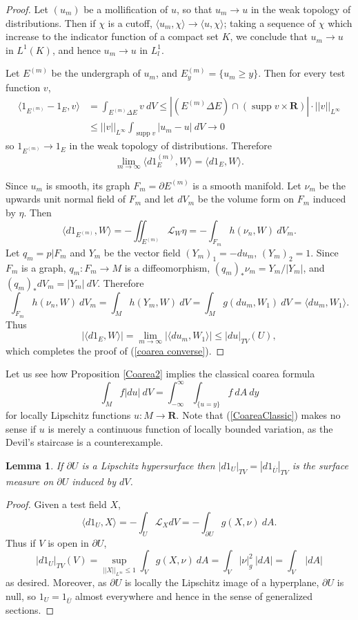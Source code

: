 \documentclass[reqno,12pt,letterpaper]{amsart}
\newcommand{\RR}{\mathbf{R}}
\DeclareMathOperator{\supp}{supp}
\newtheorem{lemma}[theorem]{Lemma}
\theoremstyle{definition}
\numberwithin{equation}{section}
\begin{document}
\begin{proof}
Let $(u_m)$ be a mollification of $u$, so that $u_m \to u$ in the weak topology of distributions.
Then if $\chi$ is a cutoff, $\langle u_m, \chi\rangle \to \langle u, \chi\rangle$; taking a sequence of $\chi$ which increase to the indicator function of a compact set $K$, we conclude that $u_m \to u$ in $L^1(K)$, and hence $u_m \to u$ in $L^1_l$.

Let $E^{(m)}$ be the undergraph of $u_m$, and $E^{(m)}_y = \{u_m \geq y\}$.
Then for every test function $v$,
\begin{align*}
\langle 1_{E^{(m)}} - 1_E, v\rangle &= \int_{E^{(m)} \Delta E} v ~dV \leq |(E^{(m)} \Delta E) \cap (\supp v \times \RR)| \cdot ||v||_{L^\infty}\\
&\leq ||v||_{L^\infty} \int_{\supp v} |u_m - u| ~dV \to 0
\end{align*}
so $1_{E^{(m)}} \to 1_E$ in the weak topology of distributions.
Therefore
$$\lim_{m \to \infty} \langle d 1_E^{(m)}, W\rangle = \langle d 1_E, W\rangle.$$

Since $u_m$ is smooth, its graph $F_m = \partial E^{(m)}$ is a smooth manifold.
Let $\nu_m$ be the upwards unit normal field of $F_m$ and let $dV_m$ be the volume form on $F_m$ induced by $\eta$.
Then
$$\langle d 1_{E^{(m)}}, W\rangle = -\iint_{E^{(m)}} \mathcal L_W\eta = -\int_{F_m} h(\nu_n, W) ~dV_m.$$
Let $q_m = p|F_m$ and $Y_m$ be the vector field $(Y_m)_1 = -d u_m$, $(Y_m)_2 = 1$.
Since $F_m$ is a graph, $q_m: F_m \to M$ is a diffeomorphism, $(q_m)_*\nu_m = Y_m/|Y_m|$, and $(q_m)_*dV_m = |Y_m|~dV$. Therefore
$$\int_{F_m} h(\nu_n, W) ~dV_m = \int_M h(Y_m, W) ~dV = \int_M g(d u_m, W_1) ~dV = \langle d u_m, W_1\rangle.$$
Thus
$$|\langle d 1_E, W\rangle| = \lim_{m \to \infty} |\langle d u_m, W_1\rangle| \leq |d u|_{TV}(U),$$
which completes the proof of (\ref{coarea converse}).
\end{proof}

Let us see how Proposition \ref{Coarea2} implies the classical coarea formula
\begin{equation}
\label{CoareaClassic}
\int_M f |du| ~dV = \int_{-\infty}^\infty \int_{\{u = y\}} f ~dA ~dy
\end{equation}
for locally Lipschitz functions $u: M \to \RR$.
Note that (\ref{CoareaClassic}) makes no sense if $u$ is merely a continuous function of locally bounded variation, as the Devil's staircase is a counterexample.

\begin{lemma}\label{Rademacher manifold}
If $\partial U$ is a Lipschitz hypersurface then $|d1_U|_{TV} = |d1_{\overline U}|_{TV}$ is the surface measure on $\partial U$ induced by $dV$.
\end{lemma}
\begin{proof}
Given a test field $X$,
$$\langle d1_U, X\rangle = -\int_U \mathcal L_XdV = -\int_{\partial U} g(X, \nu) ~dA.$$
Thus if $V$ is open in $\partial U$,
$$|d1_U|_{TV}(V) = \sup_{||X||_{L^\infty} \leq 1} \int_V g(X, \nu) ~dA = \int_V |\nu|_g^2 ~|dA| = \int_V ~|dA|$$
as desired.
Moreover, as $\partial U$ is locally the Lipschitz image of a hyperplane, $\partial U$ is null, so $1_U = 1_{\overline U}$ almost everywhere and hence in the sense of generalized sections.
\end{proof}
\end{document}
